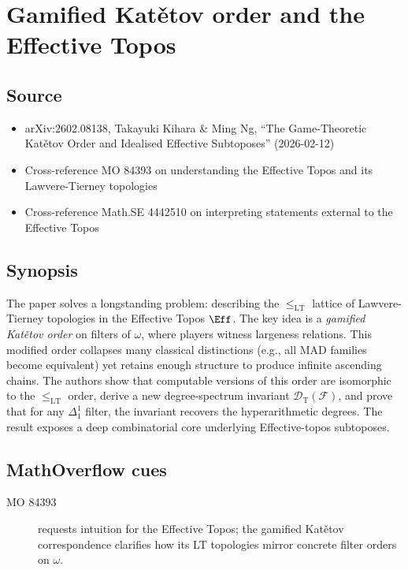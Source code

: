 \section*{Gamified Kat\v{e}tov order and the Effective Topos}
\subsection*{Source}
\begin{itemize}
  \item arXiv:2602.08138, Takayuki Kihara \& Ming Ng, ``The Game-Theoretic Katětov Order and Idealised Effective Subtoposes'' (2026-02-12)
  \item Cross-reference MO 84393 on understanding the Effective Topos and its Lawvere-Tierney topologies
  \item Cross-reference Math.SE 4442510 on interpreting statements external to the Effective Topos
\end{itemize}
\subsection*{Synopsis}
The paper solves a longstanding problem: describing the $\leq_{\mathrm{LT}}$ lattice of Lawvere-Tierney topologies in the Effective Topos $\Eff$. The key idea is a \emph{gamified Katětov order} on filters of $\omega$, where players witness largeness relations. This modified order collapses many classical distinctions (e.g., all MAD families become equivalent) yet retains enough structure to produce infinite ascending chains. The authors show that computable versions of this order are isomorphic to the $\leq_{\mathrm{LT}}$ order, derive a new degree-spectrum invariant $\mathcal{D}_{\mathrm{T}}(\mathcal{F})$, and prove that for any $\Delta^1_1$ filter, the invariant recovers the hyperarithmetic degrees. The result exposes a deep combinatorial core underlying Effective-topos subtoposes.
\subsection*{MathOverflow cues}
\begin{description}
  \item[MO 84393] requests intuition for the Effective Topos; the gamified Katětov correspondence clarifies how its LT topologies mirror concrete filter orders on $\omega$.
\end{description}
